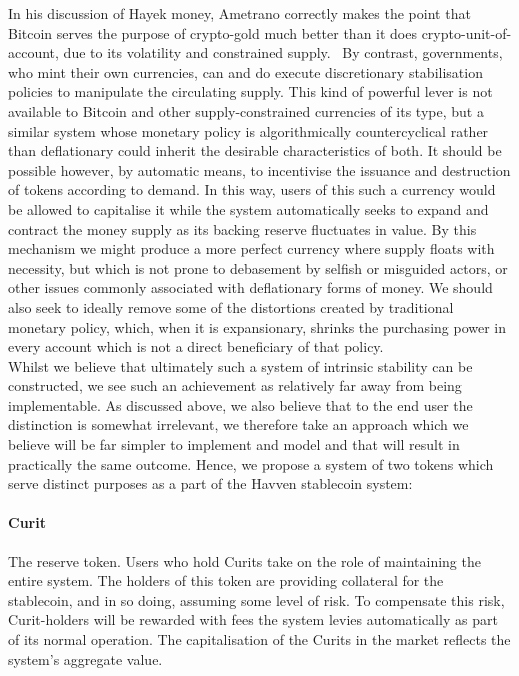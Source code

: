 \noindent  In his discussion of Hayek money, Ametrano correctly makes the point that Bitcoin serves the purpose of crypto-gold much better than it does crypto-unit-of-account, due to its volatility and constrained supply.~\cite{ametrano2016hayek} By contrast, governments, who mint their own currencies, can and do execute discretionary stabilisation policies to manipulate the circulating supply. This kind of powerful lever is not available to Bitcoin and other supply-constrained currencies of its type, but a similar system whose monetary policy is algorithmically countercyclical rather than deflationary could inherit the desirable characteristics of both. It should be possible however, by automatic means, to incentivise the issuance and destruction of tokens according to demand. In this way, users of this such a currency would be allowed to capitalise it while the system automatically seeks to expand and contract the money supply as its backing reserve fluctuates in value. By this mechanism we might produce a more perfect currency where supply floats with necessity, but which is not prone to debasement by selfish or misguided actors, or other issues commonly associated with deflationary forms of money. We should also seek to ideally remove some of the distortions created by traditional monetary policy, which, when it is expansionary, shrinks the purchasing power in every account which is not a direct beneficiary of that policy.\\

\noindent Whilst we believe that ultimately such a system of intrinsic stability can be constructed, we see such an achievement as relatively far away from being implementable. As discussed above, we also believe that to the end user the distinction is somewhat irrelevant, we therefore take an approach which we believe will be far simpler to implement and model and that will result in practically the same outcome. Hence, we propose a system of two tokens which serve distinct purposes as a part of the Havven stablecoin system:

\paragraph{Curit} The reserve token. Users who hold Curits take on the role of maintaining the entire system. The holders of this token are providing collateral for the stablecoin, and in so doing, assuming some level of risk. To compensate this risk, Curit-holders will be rewarded with fees the system levies automatically as part of its normal operation. The capitalisation of the Curits in the market reflects the system's aggregate value.

